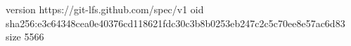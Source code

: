 version https://git-lfs.github.com/spec/v1
oid sha256:e3c64348cea0e40376cd118621fdc30c3b8b0253eb247c2c5c70ee8e57ac6d83
size 5566

